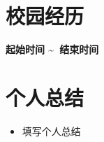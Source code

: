\documentclass[UTF8,AutoFakeBold]{resume}
\begin{document}
\section{\hspace{0.25em}\makebox[0.75em][c]{\faPaperPlane} \fangsong\textbf{校园经历}}
{\textbf{起始时间 \textasciitilde\ 结束时间}}
\section{\hspace{0.25em}\makebox[0.75em][c]{\faSignal} \fangsong\textbf{个人总结}}
\vspace{0.1em}
    \begin{itemize}
        \item \kaishu 填写个人总结
    \end{itemize}
\end{document}
